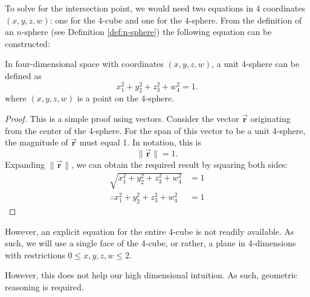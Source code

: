 To solve for the intersection point, we would need two equations in 4 coordinates $(x, y, z, w)$: one for the 4-cube and one for the 4-sphere. From the definition of an $n$-sphere (see Definition \ref{def:n-sphere}) the following equation can be constructed:
\begin{lemma}
In four-dimensional space with coordinates $(x, y, z, w)$, a unit 4-sphere can be defined as
\begin{equation}\label{eq:unit 4-sphere}
    x_1^2+y_2^2+z_3^2+w_4^2=1.
\end{equation}
where $(x, y, z, w)$ is a point on the 4-sphere.
\end{lemma}
\begin{proof}
    This is a simple proof using vectors. Consider the vector $\Vec{\mathbf{r}}$ originating from the center of the 4-sphere. For the span of this vector to be a unit 4-sphere, the magnitude of $\Vec{\mathbf{r}}$ must equal 1. In notation, this is $$\lVert\Vec{\mathbf{r}}\rVert = 1.$$
    Expanding $\lVert\Vec{\mathbf{r}}\rVert$, we can obtain the required result by squaring both sides:
    \begin{align*}
        \sqrt{x_1^2+y_2^2+z_3^2+w_4^2}&=1\\
        \therefore x_1^2+y_2^2+z_3^2+w_4^2&=1
    \end{align*}
\end{proof}

However, an explicit equation for the entire 4-cube is not readily available. As such, we will use a single face of the 4-cube, or rather, a plane in 4-dimensions with restrictions $0\leq x, y, z, w \leq 2$.

However, this does not help our high dimensional intuition. As such, geometric reasoning is required.

